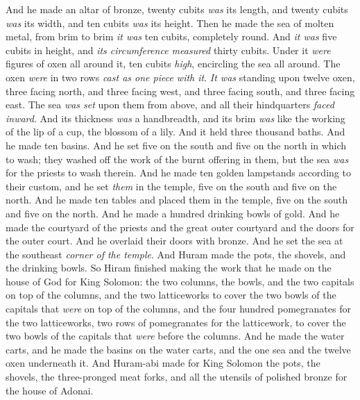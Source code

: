 \begin{biblechapter} %
 And he made an altar of bronze, twenty cubits \textit{was} its length, and twenty cubits \textit{was} its width, and ten cubits \textit{was} its height.
\verse Then he made the sea of molten metal, from brim to brim \textit{it was} ten cubits, completely round. And \textit{it was} five cubits in height, and \textit{its circumference measured} thirty cubits.
\verse Under it \textit{were} figures of oxen all around it, ten cubits \textit{high}, encircling the sea all around. The oxen \textit{were} in two rows \textit{cast as one piece with it}.
\verse \textit{It was} standing upon twelve oxen, three facing north, and three facing west, and three facing south, and three facing east. The sea \textit{was set} upon them from above, and all their hindquarters \textit{faced} \textit{inward}.
\verse And its thickness \textit{was} a handbreadth, and its brim \textit{was} like the working of the lip of a cup, the blossom of a lily. And it held three thousand baths.
\verse And he made ten basins. And he set five on the south and five on the north in which to wash; they washed off the work of the burnt offering in them, but the sea \textit{was} for the priests to wash therein.
\verse And he made ten golden lampstands according to their custom, and he set \textit{them} in the temple, five on the south and five on the north.
\verse And he made ten tables and placed them in the temple, five on the south and five on the north. And he made a hundred drinking bowls of gold.
\verse And he made the courtyard of the priests and the great outer courtyard and the doors for the outer court. And he overlaid their doors with bronze.
\verse And he set the sea at the southeast \textit{corner of the temple}.
\verse And Huram made the pots, the shovels, and the drinking bowls. So Hiram finished making the work that he made on the house of God for King Solomon:
\verse the two columns, the bowls, and the two capitals on top of the columns, and the two latticeworks to cover the two bowls of the capitals that \textit{were} on top of the columns,
\verse and the four hundred pomegranates for the two latticeworks, two rows of pomegranates for the latticework, to cover the two bowls of the capitals that \textit{were} before the columns.
\verse And he made the water carts, and he made the basins on the water carts,
\verse and the one sea and the twelve oxen underneath it.
\verse And Huram-abi made for King Solomon the pots, the shovels, the three-pronged meat forks, and all the utensils of polished bronze for the house of Adonai.

\end{biblechapter}
